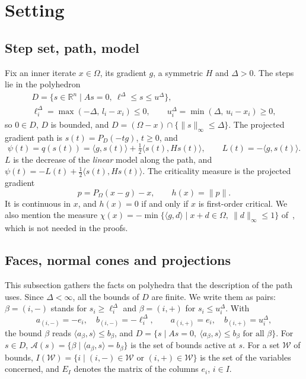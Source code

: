 \documentclass[11pt,a4paper]{article}
\numberwithin{equation}{section}
\theoremstyle{plain}
\theoremstyle{definition}
\theoremstyle{remark}
\newcommand{\R}{\mathbb{R}}
\newcommand{\inner}[2]{\langle #1,#2\rangle}
\newcommand{\calA}{\mathcal{A}}
\newcommand{\calW}{\mathcal{W}}
\begin{document}
\section{Setting}\label{sec:setting}

\subsection{Step set, path, model}

Fix an inner iterate $x\in\Omega$, its gradient $g$, a symmetric $H$ and $\Delta>0$. The steps
lie in the polyhedron
\begin{gather*}
  D=\{s\in\R^n \mid As=0,\ \ell^\Delta\le s\le u^\Delta\},\\
  \ell^\Delta_i=\max(-\Delta,\,l_i-x_i)\le0,\qquad u^\Delta_i=\min(\Delta,\,u_i-x_i)\ge0,
\end{gather*}
so $0\in D$, $D$ is bounded, and $D=(\Omega-x)\cap\{\|s\|_\infty\le\Delta\}$. The projected
gradient path is $s(t)=P_D(-tg)$, $t\ge0$, and
\[
  \psi(t)=q(s(t))=\inner{g}{s(t)}+\tfrac12\inner{s(t)}{Hs(t)},\qquad L(t)=-\inner{g}{s(t)}.
\]
$L$ is the decrease of the \emph{linear} model along the path, and
$\psi(t)=-L(t)+\tfrac12\inner{s(t)}{Hs(t)}$. The criticality measure is the projected
gradient
\[
  p=P_\Omega(x-g)-x,\qquad h(x)=\|p\|.
\]
It is continuous in $x$, and $h(x)=0$ if and only if $x$ is first-order critical. We also
mention the measure
$\chi(x)=-\min\{\inner{g}{d}\mid x+d\in\Omega,\ \|d\|_\infty\le1\}$ of~\cite{CGT00}, which is
not needed in the proofs.

\subsection{Faces, normal cones and projections}\label{subsec:faces}

This subsection gathers the facts on polyhedra that the description of the path uses. Since
$\Delta<\infty$, all the bounds of $D$ are finite. We write them as pairs: $\beta=(i,-)$ stands
for $s_i\ge\ell^\Delta_i$ and $\beta=(i,+)$ for $s_i\le u^\Delta_i$. With
\[
  a_{(i,-)}=-e_i,\quad b_{(i,-)}=-\ell^\Delta_i,\qquad a_{(i,+)}=e_i,\quad b_{(i,+)}=u^\Delta_i,
\]
the bound $\beta$ reads $\inner{a_\beta}{s}\le b_\beta$, and
$D=\{s\mid As=0,\ \inner{a_\beta}{s}\le b_\beta\text{ for all }\beta\}$. For $s\in D$,
$\calA(s)=\{\beta\mid\inner{a_\beta}{s}=b_\beta\}$ is the set of bounds active at $s$. For a set
$\calW$ of bounds, $I(\calW)=\{i\mid(i,-)\in\calW\text{ or }(i,+)\in\calW\}$ is the set of the
variables concerned, and $E_I$ denotes the matrix of the columns $e_i$, $i\in I$.
\end{document}
